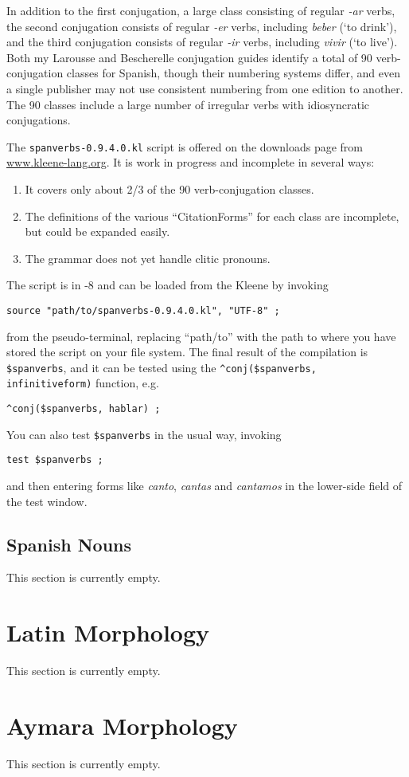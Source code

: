 In addition to the first conjugation, a large class consisting of regular
\mbox{\emph{-ar}} verbs, 
the second conjugation consists of regular \mbox{\emph{-er}} verbs, including \emph{beber} (`to drink'), and the third conjugation consists of
regular \mbox{\emph{-ir}} verbs, including \emph{vivir} (`to live').  Both my Larousse and Bescherelle conjugation guides identify a total
of 90 verb-conjugation classes for Spanish, though their numbering systems differ, and even a
single publisher may not use consistent numbering from one edition to another.  The 90 classes
include a large number of irregular verbs with idiosyncratic conjugations.

The \verb!spanverbs-0.9.4.0.kl! script is offered on the downloads page from
\url{www.kleene-lang.org}.  It is work in progress and incomplete in several
ways:

\begin{enumerate}
	\item
It covers only about 2/3 of the 90 verb-conjugation classes.
\item
The definitions of the various ``CitationForms'' for each class are incomplete,
but could be expanded easily.
\item
The grammar does not yet handle clitic pronouns.
\end{enumerate}

\noindent
The script is in -8 and can be loaded from the Kleene \gui{} by
invoking


\begin{Verbatim}
source "path/to/spanverbs-0.9.4.0.kl", "UTF-8" ;
\end{Verbatim}

\noindent
from the pseudo-terminal, replacing ``path/to'' with the path to where
you have stored the script on your file system.  The final result of the compilation is
\verb!$spanverbs!, and it can be tested using the 
\verb!^conj($spanverbs, infinitiveform)! function, e.g.


\begin{Verbatim}
^conj($spanverbs, hablar) ;
\end{Verbatim}

You can also test \verb!$spanverbs! in the usual way, invoking


\begin{Verbatim}
test $spanverbs ;
\end{Verbatim}

\noindent
and then entering forms like \emph{canto}, \emph{cantas} and \emph{cantamos}
in the lower-side field of the test window.


\subsection{Spanish Nouns}

This section is currently empty.

\section{Latin Morphology}

This section is currently empty.

\section{Aymara Morphology}

This section is currently empty.
